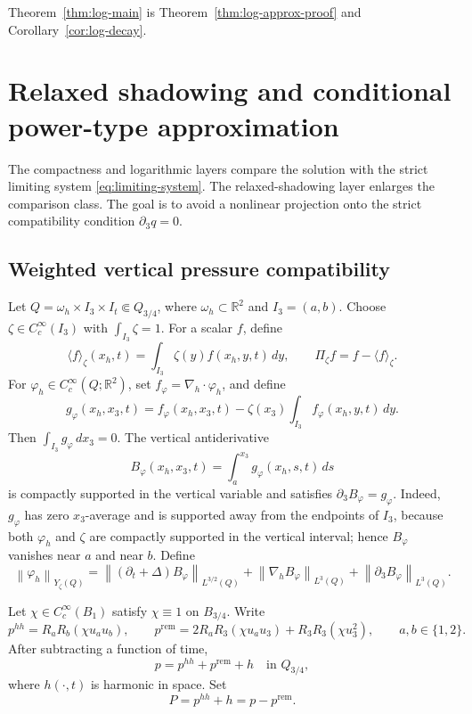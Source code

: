 \documentclass[pdflatex,sn-mathphys-num]{sn-jnl}
\numberwithin{equation}{section}
\theoremstyle{thmstyleone}
\theoremstyle{thmstylethree}
\newcommand{\R}{\mathbb R}
\newcommand{\nabh}{\nabla_h}
\newcommand{\norm}[2]{\left\|#1\right\|_{#2}}
\newcommand{\rem}{\mathrm{rem}}
\begin{document}
Theorem~\ref{thm:log-main} is Theorem~\ref{thm:log-approx-proof} and Corollary~\ref{cor:log-decay}.

\section{Relaxed shadowing and conditional power-type approximation}
\label{sec:relaxed}

The compactness and logarithmic layers compare the solution with the strict limiting system \eqref{eq:limiting-system}.  The relaxed-shadowing layer enlarges the comparison class.  The goal is to avoid a nonlinear projection onto the strict compatibility condition \(\partial_3q=0\).

\subsection{Weighted vertical pressure compatibility}

Let \(Q=\omega_h\times I_3\times I_t\Subset Q_{3/4}\), where \(\omega_h\subset\R^2\) and \(I_3=(a,b)\).  Choose \(\zeta\in C_c^\infty(I_3)\) with \(\int_{I_3}\zeta=1\).  For a scalar \(f\), define
\[
        \langle f\rangle_\zeta(x_h,t)
        =\int_{I_3}\zeta(y)f(x_h,y,t)\,dy,
        \qquad
        \Pi_\zeta f=f-\langle f\rangle_\zeta.
\]
For \(\varphi_h\in C_c^\infty(Q;\R^2)\), set \(f_\varphi=\nabh\cdot\varphi_h\), and define
\[
        g_\varphi(x_h,x_3,t)
        =f_\varphi(x_h,x_3,t)
        -\zeta(x_3)\int_{I_3}f_\varphi(x_h,y,t)\,dy.
\]
Then \(\int_{I_3}g_\varphi\,dx_3=0\).  The vertical antiderivative
\[
        B_\varphi(x_h,x_3,t)=\int_a^{x_3}g_\varphi(x_h,s,t)\,ds
\]
is compactly supported in the vertical variable and satisfies \(\partial_3B_\varphi=g_\varphi\).  Indeed, \(g_\varphi\) has zero \(x_3\)-average and is supported away from the endpoints of \(I_3\), because both \(\varphi_h\) and \(\zeta\) are compactly supported in the vertical interval; hence \(B_\varphi\) vanishes near \(a\) and near \(b\).  Define
\[
\norm{\varphi_h}{Y_\zeta(Q)}
=\norm{(\partial_t+\Delta)B_\varphi}{L^{3/2}(Q)}
+\norm{\nabh B_\varphi}{L^3(Q)}
+\norm{\partial_3B_\varphi}{L^3(Q)}.
\]

Let \(\chi\in C_c^\infty(B_1)\) satisfy \(\chi\equiv1\) on \(B_{3/4}\).  Write
\[
        p^{hh}=R_aR_b(\chi u_au_b),
        \qquad
        p^{\rem}=2R_aR_3(\chi u_au_3)+R_3R_3(\chi u_3^2),
        \qquad a,b\in\{1,2\}.
\]
After subtracting a function of time,
\[
        p=p^{hh}+p^{\rem}+h
        \quad\text{in }Q_{3/4},
\]
where \(h(\cdot,t)\) is harmonic in space.  Set
\[
        P=p^{hh}+h=p-p^{\rem}.
\]
\end{document}

